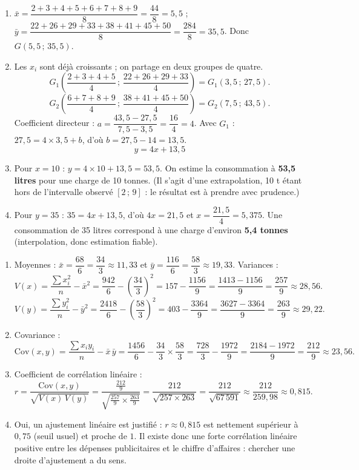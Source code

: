 \documentclass[11pt]{article}
\newcommand{\cle}[1]{{\popxbold\color{popdark}#1}}
\begin{document}
\begin{corrige}
\begin{enumerate}
\item $\bar{x}=\dfrac{2+3+4+5+6+7+8+9}{8}=\dfrac{44}{8}=5{,}5$ ;
$\bar{y}=\dfrac{22+26+29+33+38+41+45+50}{8}=\dfrac{284}{8}=35{,}5$.
Donc $G(5{,}5\,;\,35{,}5)$.
\item Les $x_i$ sont déjà croissants ; on partage en deux groupes de quatre.
\[ G_1\left(\frac{2+3+4+5}{4}\,;\,\frac{22+26+29+33}{4}\right)=G_1(3{,}5\,;\,27{,}5). \]
\[ G_2\left(\frac{6+7+8+9}{4}\,;\,\frac{38+41+45+50}{4}\right)=G_2(7{,}5\,;\,43{,}5). \]
Coefficient directeur : $a=\dfrac{43{,}5-27{,}5}{7{,}5-3{,}5}=\dfrac{16}{4}=4$.
Avec $G_1$ : $27{,}5=4\times 3{,}5+b$, d'où $b=27{,}5-14=13{,}5$.
\[ \boxed{y=4x+13{,}5} \]
\item Pour $x=10$ : $y=4\times 10+13{,}5=53{,}5$. On estime la consommation à \textbf{53,5 litres} pour une charge de 10 tonnes. (Il s'agit d'une extrapolation, 10 t étant hors de l'intervalle observé $[2\,;\,9]$ : le résultat est à prendre avec prudence.)
\item Pour $y=35$ : $35=4x+13{,}5$, d'où $4x=21{,}5$ et $x=\dfrac{21{,}5}{4}=5{,}375$. Une consommation de 35 litres correspond à une charge d'environ \textbf{5,4 tonnes} (interpolation, donc estimation fiable).
\end{enumerate}
\end{corrige}

\begin{corrige}
\begin{enumerate}
\item Moyennes : $\bar{x}=\dfrac{68}{6}=\dfrac{34}{3}\approx 11{,}33$ et $\bar{y}=\dfrac{116}{6}=\dfrac{58}{3}\approx 19{,}33$.
Variances :
\[ V(x)=\frac{\sum x_i^2}{n}-\bar{x}^2=\frac{942}{6}-\left(\frac{34}{3}\right)^2=157-\frac{1156}{9}=\frac{1413-1156}{9}=\frac{257}{9}\approx 28{,}56. \]
\[ V(y)=\frac{\sum y_i^2}{n}-\bar{y}^2=\frac{2418}{6}-\left(\frac{58}{3}\right)^2=403-\frac{3364}{9}=\frac{3627-3364}{9}=\frac{263}{9}\approx 29{,}22. \]
\item Covariance :
\[ \mathrm{Cov}(x,y)=\frac{\sum x_i y_i}{n}-\bar{x}\,\bar{y}=\frac{1456}{6}-\frac{34}{3}\times\frac{58}{3}=\frac{728}{3}-\frac{1972}{9}=\frac{2184-1972}{9}=\frac{212}{9}\approx 23{,}56. \]
\item Coefficient de corrélation linéaire :
\[ r=\frac{\mathrm{Cov}(x,y)}{\sqrt{V(x)\,V(y)}}=\frac{\frac{212}{9}}{\sqrt{\frac{257}{9}\times\frac{263}{9}}}=\frac{212}{\sqrt{257\times 263}}=\frac{212}{\sqrt{67\,591}}\approx\frac{212}{259{,}98}\approx 0{,}815. \]
\item Oui, un ajustement linéaire est justifié : $r\approx 0{,}815$ est nettement supérieur à $0{,}75$ (seuil usuel) et proche de $1$. Il existe donc une \cle{forte corrélation linéaire positive} entre les dépenses publicitaires et le chiffre d'affaires : chercher une droite d'ajustement a du sens.
\end{enumerate}
\end{corrige}
\end{document}
